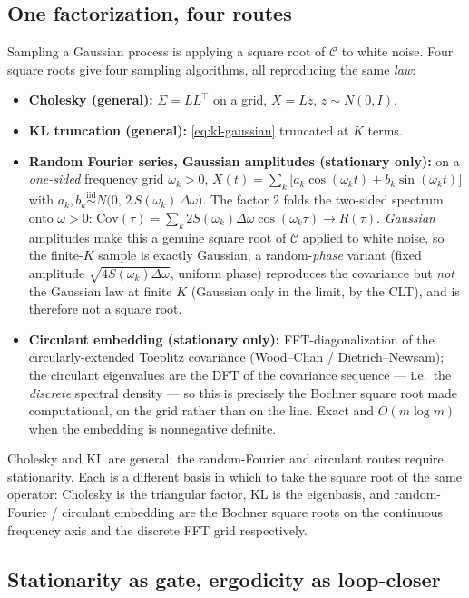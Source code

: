 \documentclass[11pt]{article}
\begin{document}
\subsection{One factorization, four routes}

Sampling a Gaussian process is applying a square root of $\mathcal{C}$ to white noise. Four square roots give four sampling algorithms, all reproducing the same \emph{law}:
\begin{itemize}[leftmargin=1.4cm]
  \item \textbf{Cholesky (general):} $\Sigma = LL^\top$ on a grid, $X = Lz$, $z\sim N(0,I)$.
  \item \textbf{KL truncation (general):} \eqref{eq:kl-gaussian} truncated at $K$ terms.
  \item \textbf{Random Fourier series, Gaussian amplitudes (stationary only):} on a \emph{one-sided} frequency grid $\omega_k>0$,
  $X(t) = \sum_k \big[a_k\cos(\omega_k t) + b_k\sin(\omega_k t)\big]$ with $a_k,b_k \overset{\text{iid}}{\sim} N\!\big(0,\,2\,S(\omega_k)\,\Delta\omega\big)$. The factor $2$ folds the two-sided spectrum onto $\omega>0$: $\mathrm{Cov}(\tau)=\sum_k 2S(\omega_k)\Delta\omega\cos(\omega_k\tau)\to R(\tau)$. \emph{Gaussian} amplitudes make this a genuine square root of $\mathcal{C}$ applied to white noise, so the finite-$K$ sample is exactly Gaussian; a random-\emph{phase} variant (fixed amplitude $\sqrt{4S(\omega_k)\Delta\omega}$, uniform phase) reproduces the covariance but \emph{not} the Gaussian law at finite $K$ (Gaussian only in the limit, by the CLT), and is therefore not a square root.
  \item \textbf{Circulant embedding (stationary only):} FFT-diagonalization of the circularly-extended Toeplitz covariance (Wood--Chan / Dietrich--Newsam); the circulant eigenvalues are the DFT of the covariance sequence --- i.e.\ the \emph{discrete} spectral density --- so this is precisely the Bochner square root made computational, on the grid rather than on the line. Exact and $O(m\log m)$ when the embedding is nonnegative definite.
\end{itemize}
Cholesky and KL are general; the random-Fourier and circulant routes require stationarity. Each is a different basis in which to take the square root of the same operator: Cholesky is the triangular factor, KL is the eigenbasis, and random-Fourier / circulant embedding are the Bochner square roots on the continuous frequency axis and the discrete FFT grid respectively.

\subsection{Stationarity as gate, ergodicity as loop-closer}
\end{document}
